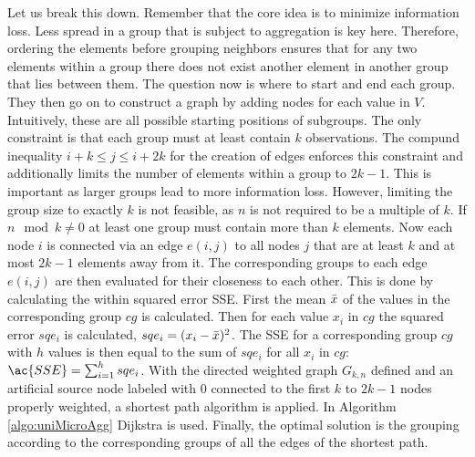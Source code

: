 Let us break this down. Remember that the core idea is to minimize information loss. Less spread in a group that is subject to aggregation is key here. Therefore, ordering the elements before grouping neighbors ensures that for any two elements within a group there does not exist another element in another group that lies between them. The question now is where to start and end each group. They then go on to construct a graph by adding nodes for each value in $V$. Intuitively, these are all possible starting positions of subgroups. The only constraint is that each group must at least contain $k$ observations. The compund inequality $i + k \leq j \le i + 2k$ for the creation of edges enforces this constraint and additionally limits the number of elements within a group to $2k - 1$. This is important as larger groups lead to more information loss. However, limiting the group size to exactly $k$ is not feasible, as $n$ is not required to be a multiple of $k$. If $n \mod k \neq 0$ at least one group must contain more than $k$ elements. Now each node $i$ is connected via an edge $e(i,j)$ to all nodes $j$ that are at least $k$ and at most $2k - 1$ elements away from it. The corresponding groups to each edge $e(i,j)$ are then evaluated for their closeness to each other. This is done by calculating the within squared error \ac{SSE}. First the mean $\bar{x}$ of the values in the corresponding group $cg$ is calculated. Then for each value $x_{i}$ in $cg$ the squared error $sqe_i$ is calculated, $sqe_i = (x_i - \bar{x})^2$. The \ac{SSE} for a corresponding group $cg$ with $h$ values is then equal to the sum of $sqe_i$ for all $x_{i}$ in $cg$: $\ac{SSE} = \sum_{i=1}^{h}sqe_i$. With the directed weighted graph $G_{k,n}$ defined and an artificial source node labeled with $0$ connected to the first $k$ to $2k-1$ nodes properly weighted, a shortest path algorithm is applied. In Algorithm \ref{algo:uniMicroAgg} Dijkstra \cite{dijkstra2022note} is used. Finally, the optimal solution is the grouping according to the corresponding groups of all the edges of the shortest path.\\\\

